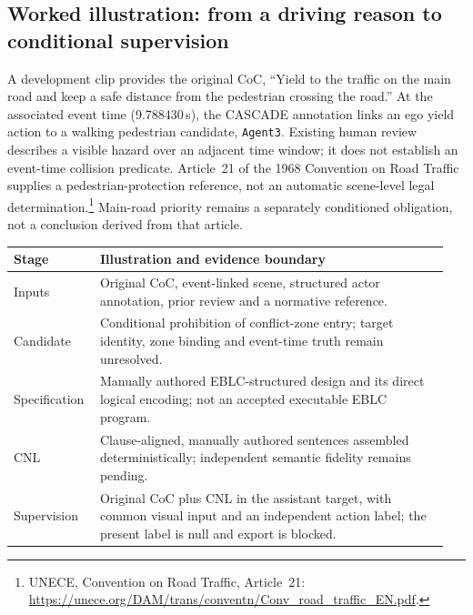 \subsection{Worked illustration: from a driving reason to conditional supervision}
\label{sec:scene18-worked-example}

A development clip provides the original CoC, ``Yield to the traffic on the main
road and keep a safe distance from the pedestrian crossing the road.''
At the associated event time (9.788430\,s), the CASCADE annotation links an ego
yield action to a walking pedestrian candidate, \texttt{Agent3}. Existing human
review describes a visible hazard over an adjacent time window; it does not
establish an event-time collision predicate. Article~21 of the 1968 Convention
on Road Traffic supplies a pedestrian-protection reference, not an automatic
scene-level legal determination.\footnote{UNECE, Convention on Road Traffic,
Article~21: \url{https://unece.org/DAM/trans/conventn/Conv_road_traffic_EN.pdf}.}
Main-road priority remains a separately conditioned obligation, not a conclusion
derived from that article.

\begin{center}
\small
\begin{tabular}{@{}p{0.18\linewidth}p{0.77\linewidth}@{}}
\toprule
Stage & Illustration and evidence boundary \\
\midrule
Inputs & Original CoC, event-linked scene, structured actor annotation,
prior review and a normative reference. \\
Candidate & Conditional prohibition of conflict-zone entry; target identity,
zone binding and event-time truth remain unresolved. \\
Specification & Manually authored EBLC-structured design and its direct logical
encoding; not an accepted executable EBLC program. \\
CNL & Clause-aligned, manually authored sentences assembled deterministically;
independent semantic fidelity remains pending. \\
Supervision & Original CoC plus CNL in the assistant target, with common visual
input and an independent action label; the present label is null and export is blocked. \\
\bottomrule
\end{tabular}
\end{center}

